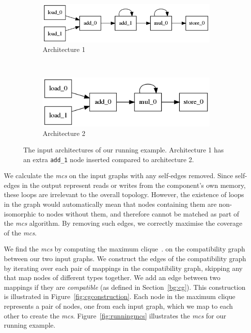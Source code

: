 \begin{figure}[!htb]
  \begin{subfigure}{\textwidth}
    \centering
    \includegraphics[scale=0.5]{graphs/running_example1.png}
    \caption{Architecture 1}
    \label{fig:running_example:a}
  \end{subfigure}\\
  \begin{subfigure}{\textwidth}
    \centering
    \includegraphics[scale=0.5]{graphs/running_example2.png}
    \caption{Architecture 2}
    \label{fig:running_example:b}
  \end{subfigure}
\caption{The input architectures of our running example. Architecture 1 has an extra \texttt{add\_1} node inserted compared to architecture 2.}
\label{fig:running_example}
\end{figure}

We calculate the \textit{mcs} on the input graphs with any self-edges removed. Since self-edges in the \microgenie output represent reads or writes from the component's own memory, these loops are irrelevant to the overall topology. However, the existence of loops in the graph would automatically mean that nodes containing them are non-isomorphic to nodes without them, and therefore cannot be matched as part of the \textit{mcs} algorithm. By removing such edges, we correctly maximise the coverage of the \textit{mcs}.

We find the \textit{mcs} by computing the maximum clique~\cite{konc2007improved}. on the compatibility graph between our two input graphs. We construct the edges of the compatibility graph by iterating over each pair of mappings in the compatibility graph, skipping any that map nodes of different types together. We add an edge between two mappings if they are \textit{compatible} (as defined in Section~\ref{bg:cg}). This construction is illustrated in Figure~\ref{fig:cgconstruction}. Each node in the maximum clique represents a pair of nodes, one from each input graph, which we map to each other to create the \textit{mcs}. Figure~\ref{fig:runningmcs} illustrates the \textit{mcs} for our running example.


